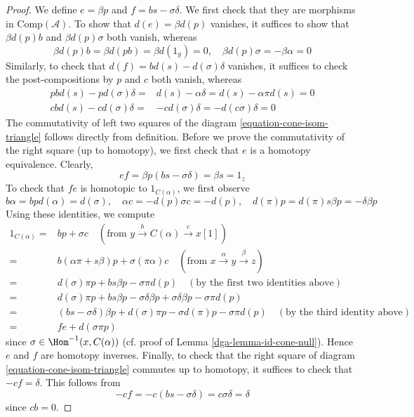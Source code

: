 \begin{proof}
\medskip\noindent
We define $e=\beta p$ and $f=bs-\sigma\delta$. We first check that they are
morphisms in $\text{Comp}(\mathcal{A})$. To show that $d(e)=\beta d(p)$
vanishes, it suffices to show that $\beta d(p)b$ and $\beta d(p)\sigma$
both vanish, whereas
$$
\beta d(p)b = \beta d(pb) = \beta d(1_y) = 0,\quad
\beta d(p)\sigma = -\beta\alpha = 0
$$
Similarly, to check that $d(f)=bd(s)-d(\sigma)\delta$ vanishes,
it suffices to check the post-compositions by $p$ and $c$ both vanish,
whereas
\begin{align*}
pbd(s) - pd(\sigma)\delta
= &
d(s)-\alpha\delta = d(s)-\alpha\pi d(s) = 0 \\
cbd(s)-cd(\sigma)\delta
= &
-cd(\sigma)\delta = -d(c\sigma)\delta = 0
\end{align*}
The commutativity of left two squares of the
diagram \ref{equation-cone-isom-triangle} follows directly from definition.
Before we prove the commutativity of the right square (up to homotopy),
we first check that $e$ is a homotopy equivalence. Clearly,
$$
ef=\beta p (bs-\sigma\delta)=\beta s=1_z
$$
To check that $fe$ is homotopic to $1_{C(\alpha)}$, we first observe
$$
b\alpha = bpd(\alpha) = d(\sigma),\quad
\alpha c = -d(p)\sigma c = -d(p),\quad
d(\pi)p = d(\pi)s\beta p = -\delta\beta p
$$
Using these identities, we compute
\begin{align*}
1_{C(\alpha)} = &
bp + \sigma c
\quad (\text{from }y \xrightarrow{b} C(\alpha) \xrightarrow{c} x[1]) \\
= &
b(\alpha\pi + s\beta)p + \sigma(\pi\alpha)c
\quad (\text{from }x \xrightarrow{\alpha} y \xrightarrow{\beta} z) \\
= &
d(\sigma)\pi p + bs\beta p - \sigma\pi d(p)
\quad (\text{by the first two identities above}) \\
= &
d(\sigma)\pi p + bs\beta p - \sigma\delta\beta p
+ \sigma\delta\beta p - \sigma\pi d(p) \\
= &
(bs - \sigma\delta)\beta p + d(\sigma)\pi p
- \sigma d(\pi)p - \sigma\pi d(p)\quad
(\text{by the third identity above}) \\
= &
fe + d(\sigma \pi p)
\end{align*}
since $\sigma \in \Hom^{-1}(x, C(\alpha))$
(cf. proof of Lemma \ref{dga-lemma-id-cone-null}).
Hence $e$ and $f$ are homotopy inverses.
Finally, to check that the right square of
diagram \ref{equation-cone-isom-triangle} commutes up to homotopy,
it suffices to check that $-cf=\delta$. This follows from
$$
-cf = -c(bs-\sigma\delta) = c\sigma\delta = \delta
$$
since $cb=0$.


\end{proof}
